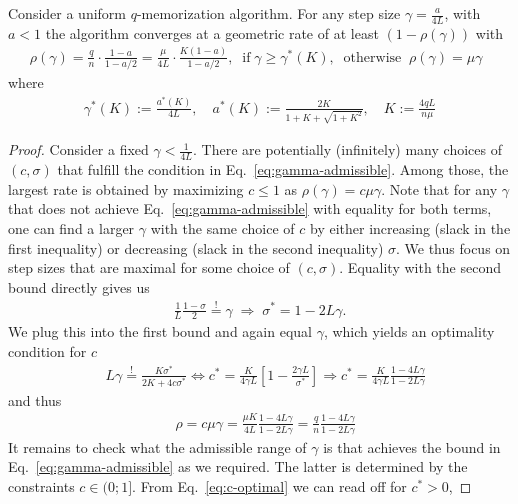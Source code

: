 \begin{theorem}
\label{theorem:main-appendix}
Consider  a uniform $q$-memorization algorithm. For any step size $\gamma = \frac a {4L}$, with $a<1$ the algorithm converges at a geometric rate of at least $(1-\rho(\gamma))$ with 
\begin{align*}
\rho(\gamma) = \frac{q}{n} \cdot \frac{1 - a}{1-a/2} 
= \frac{\mu}{4L} \cdot \frac{K (1 - a)}{1-a/2}, \;\;  \text{if} \;\gamma \geq \gamma^*(K), \;\; 
\text{otherwise} \;\; \rho(\gamma) = \mu \gamma   \;\; 
\end{align*}
where 
\begin{align*}
\gamma^*(K) :=  \frac {a^*(K)} {4 L}, \quad 
a^*(K) := \frac{2K}{1+K + \sqrt{1+K^2}},
%
\quad K:=  \frac{4qL}{n \mu}
\end{align*}
\begin{proof} 
Consider a fixed $\gamma < \frac 1{4L}$. There are potentially (infinitely) many choices of $(c,\sigma)$ that fulfill the condition in Eq.~\eqref{eq:gamma-admissible}. Among those, the largest rate is obtained by maximizing $c \le 1$ as $\rho(\gamma) = c \mu \gamma$. Note that for any $\gamma$ that does not achieve Eq.~\eqref{eq:gamma-admissible} with equality for both terms, one can find a larger $\gamma$ with the same choice of $c$ by either increasing (slack in the first inequality) or decreasing (slack in the second inequality) $\sigma$. We thus focus on step sizes that are maximal for some choice of $(c,\sigma)$. Equality with the second bound directly gives us
\begin{align} \label{eq:sigma-star}
\frac 1 L \frac{1-\sigma}{2} \stackrel != \gamma \; \Longrightarrow \; \sigma^*  = 1 - 2L \gamma.
\end{align} We plug this into the first bound and again equal $\gamma$, which yields an optimality condition for $c$
\begin{align}
& L \gamma  \stackrel != \frac{K \sigma^*}{2K + 4c \sigma^* } 
 \iff   c^*  %
= \frac K{4\gamma L} \left[ 1 - \frac{2 \gamma L}{\sigma^*} \right]
\Longrightarrow c^* = \frac K{4\gamma L}  \frac{1 - 4 L \gamma}{1 - 2L \gamma}
\label{eq:c-optimal}
\end{align}
and thus
\begin{align}
& \rho = c \mu \gamma = \frac{\mu K}{4L} \frac{1 - 4 L \gamma}{1 - 2L \gamma}
= \frac{q}{n}  \frac{1 - 4 L \gamma}{1 - 2L \gamma}
\end{align}
It remains to check what the admissible range of $\gamma$ is that achieves the bound in Eq.~\eqref{eq:gamma-admissible} as we required. The latter is determined by the constraints $c \in (0;1]$.  From Eq.~\eqref{eq:c-optimal} we can read off for $c^*>0$, 

\end{proof}
\end{theorem}
